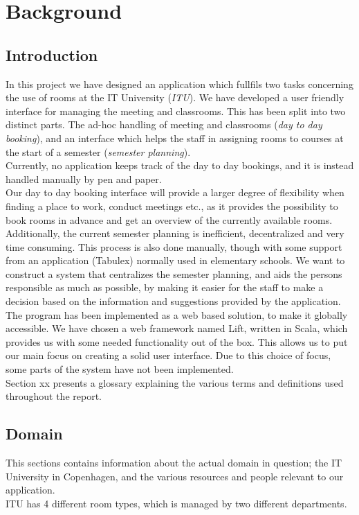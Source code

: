 \chapter{Background}
\section{Introduction}
In this project we have designed an application which fullfils two tasks concerning the use of rooms at the IT University (\emph{ITU}). We have developed a user friendly interface for managing the meeting and classrooms. This has been split into two distinct parts. The ad-hoc handling of meeting and classrooms (\emph{day to day booking}), and an interface which helps the staff in assigning rooms to courses at the start of a semester (\emph{semester planning}).\\

Currently, no application keeps track of the day to day bookings, and it is instead handled manually by pen and paper.\\
Our day to day booking interface will provide a larger degree of flexibility when finding a place to work, conduct meetings etc., as it provides the possibility to book rooms in advance and get an overview of the currently available rooms.\\

Additionally, the current semester planning is inefficient, decentralized and very time consuming. This process is also done manually, though with some support from an application (Tabulex\cite{tabulex}) normally used in elementary schools.
We want to construct a system that centralizes the semester planning, and aids the persons responsible as much as possible, by making it easier for the staff to make a decision based on the information and suggestions provided by the application. \\

The program has been implemented as a web based solution, to make it globally accessible. We have chosen a web framework named Lift, written in Scala, which provides us with some needed functionality out of the box. This allows us to put our main focus on creating a solid user interface. Due to this choice of focus, some parts of the system have not been implemented.\\

Section xx presents a glossary explaining the various terms and definitions used throughout the report.

\pagebreak
\section{Domain}
\label{sec:domain}
This sections contains information about the actual domain in question; the IT University in Copenhagen, and the various resources and people relevant to our application. \\
ITU has 4 different room types, which is managed by two different departments.


